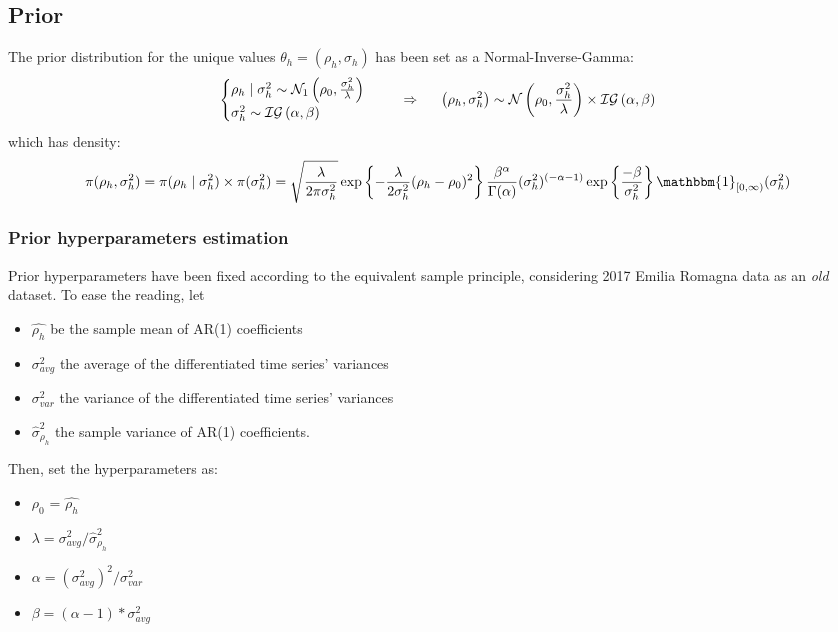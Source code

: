 \documentclass[12pt,a4paper]{article}
\begin{document}
\subsection{Prior}\label{prior}

The prior distribution for the unique values $\theta_h=(\rho_h,\sigma_h)$ has been set as a Normal-Inverse-Gamma:
$$
\begin{cases}
    \rho_{h} \mid \sigma_{h}^{2} \sim \mathcal{N}_1\left(\rho_{0}, \frac{\sigma_{h}^{2}}{\lambda}\right)\\
    \sigma_{h}^{2} \sim \mathcal{IG}\left(\alpha, \beta\right)
\end{cases}
\hspace{0.5cm}
\Rightarrow
\hspace{0.5cm}
\left(\rho_{h}, \sigma_{h}^{2}\right) \sim 
\mathcal{N}\left(\rho_{0}, \frac{\sigma_{h}^{2}}{\lambda}\right) \times \mathcal{IG}\left(\alpha, \beta\right)
$$
which has density:
$$
\pi(\rho_{h}, \sigma_{h}^{2}) = \pi(\rho_{h} \mid \sigma_{h}^{2}) \times \pi(\sigma_{h}^{2}) = \sqrt{\frac{\lambda}{2 \pi \sigma_{h}^{2} } } \exp \left\{ - \frac{\lambda}{2 \sigma_{h}^{2} } (\rho_{h}-\rho_{0})^{2}\right\} \frac{\beta^{\alpha}}{\Gamma(\alpha)} (\sigma_{h}^{2})^{(-\alpha-1)} \exp\left\{\frac{-\beta}{\sigma_{h}^{2}}\right\} \mathbbm{1}_{[0, \infty)}{(\sigma_{h}^{2})}
$$

\subsubsection{Prior hyperparameters estimation}
Prior hyperparameters have been fixed according to the equivalent sample principle, considering 2017 Emilia Romagna data as an \textit{old} dataset. To ease the reading, let
\begin{itemize}
\item $\hat{ \rho_h } $ be the sample mean of AR(1) coefficients
\item $\sigma^2_{avg}$ the average of the differentiated time series' variances
\item $\sigma^2_{var}$ the variance of the differentiated time series' variances
\item $\hat{\sigma}^2_{\rho_h}$ the sample variance of AR(1) coefficients.
\end{itemize}
Then, set the hyperparameters as:
\begin{itemize}
    \item $\rho_0$ = $\hat{ \rho_h } $
    \item $\lambda = \sigma^2_{avg} / \hat{\sigma}^2_{\rho_h}$  
    \item $\alpha = ( \sigma^2_{avg} )^2 / \sigma^2_{var} $
    \item $\beta = (\alpha-1)*\sigma^2_{avg} $
\end{itemize}
\end{document}
